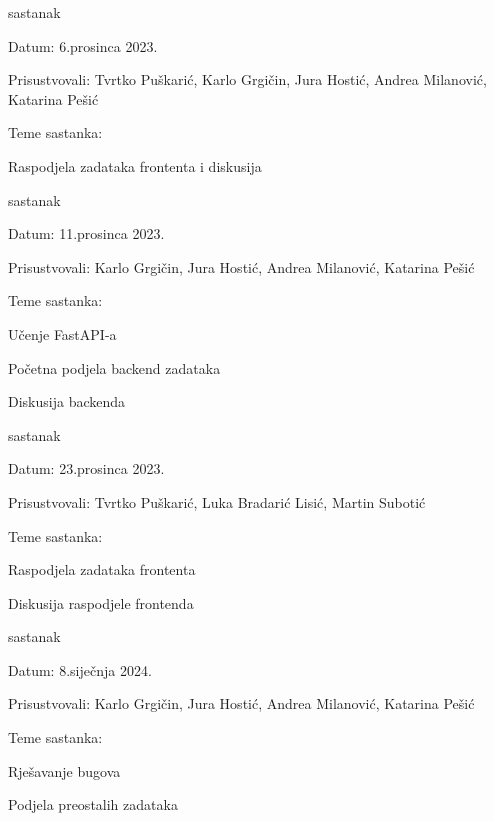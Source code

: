 \begin{packed_enum}
			\item  sastanak
			\item[] \begin{packed_item}
				\item Datum: 6.prosinca 2023.
				\item Prisustvovali: Tvrtko Puškarić, Karlo Grgičin, Jura Hostić, Andrea Milanović, Katarina Pešić
				\item Teme sastanka:
				\begin{packed_item}
					\item Raspodjela zadataka frontenta i diskusija
				\end{packed_item}
			\end{packed_item}
			
			\item  sastanak
			\item[] \begin{packed_item}
				\item Datum: 11.prosinca 2023.
				\item Prisustvovali: Karlo Grgičin, Jura Hostić, Andrea Milanović, Katarina Pešić
				\item Teme sastanka:
				\begin{packed_item}
					\item Učenje FastAPI-a
					\item Početna podjela backend zadataka
					\item Diskusija backenda
				\end{packed_item}
			\end{packed_item}
			
			\item  sastanak
			\item[] \begin{packed_item}
				\item Datum: 23.prosinca 2023.
				\item Prisustvovali: Tvrtko Puškarić, Luka Bradarić Lisić,  Martin Subotić
				\item Teme sastanka:
				\begin{packed_item}
					\item Raspodjela zadataka frontenta
					\item Diskusija raspodjele frontenda
				\end{packed_item}
			\end{packed_item}
			
			\item  sastanak
			\item[] \begin{packed_item}
				\item Datum: 8.siječnja 2024.
				\item Prisustvovali: Karlo Grgičin, Jura Hostić, Andrea Milanović, Katarina Pešić
				\item Teme sastanka:
				\begin{packed_item}
					\item Rješavanje bugova
					\item Podjela preostalih zadataka
				\end{packed_item}
			\end{packed_item}
			

\end{packed_enum}
